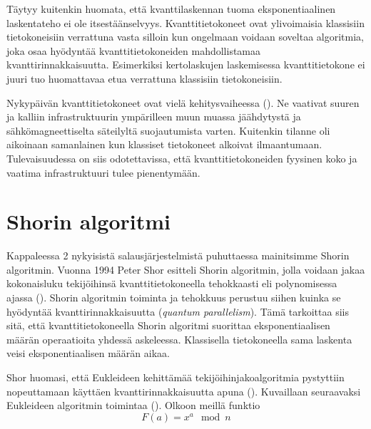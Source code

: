 Täytyy kuitenkin huomata, että kvanttilaskennan tuoma eksponentiaalinen laskentateho ei ole itsestäänselvyys. Kvanttitietokoneet ovat ylivoimaisia klassisiin tietokoneisiin verrattuna vasta silloin kun ongelmaan voidaan soveltaa algoritmia, joka osaa hyödyntää kvanttitietokoneiden mahdollistamaa kvanttirinnakkaisuutta. Esimerkiksi kertolaskujen laskemisessa kvanttitietokone ei juuri tuo huomattavaa etua verrattuna klassisiin tietokoneisiin.

Nykypäivän kvanttitietokoneet ovat vielä kehitysvaiheessa (\cite{doi:10.1080/23742917.2016.1226650}). Ne vaativat suuren ja kalliin infrastruktuurin ympärilleen muun muassa jäähdytystä ja sähkömagneettiselta säteilyltä suojautumista varten. Kuitenkin tilanne oli aikoinaan samanlainen kun klassiset tietokoneet alkoivat ilmaantumaan. Tulevaisuudessa on siis odotettavissa, että kvanttitietokoneiden fyysinen koko ja vaatima infrastruktuuri tulee pienentymään.

\section{Shorin algoritmi}
Kappaleessa 2 nykyisistä salausjärjestelmistä puhuttaessa mainitsimme Shorin algoritmin. Vuonna 1994 Peter Shor esitteli Shorin algoritmin, jolla voidaan jakaa kokonaisluku tekijöihinsä kvanttitietokoneella tehokkaasti eli polynomisessa ajassa (\cite{hayward2008quantum}). Shorin algoritmin toiminta ja tehokkuus perustuu siihen kuinka se hyödyntää kvanttirinnakkaisuutta (\emph{quantum parallelism}). Tämä tarkoittaa siis sitä, että kvanttitietokoneella Shorin algoritmi suorittaa eksponentiaalisen määrän operaatioita yhdessä askeleessa. Klassisella tietokoneella sama laskenta veisi eksponentiaalisen määrän aikaa.

Shor huomasi, että Eukleideen kehittämää tekijöihinjakoalgoritmia pystyttiin nopeuttamaan käyttäen kvanttirinnakkaisuutta apuna (\cite{doi:10.1080/23742917.2016.1226650}). Kuvaillaan seuraavaksi Eukleideen algoritmin toimintaa (\cite{hayward2008quantum}). Olkoon meillä funktio
\begin{equation}
    \label{eq1}
    F(a) = x^{a} \mod n
\end{equation}

